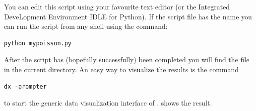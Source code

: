 You can edit this script using your favourite text editor (or the Integrated DeveLopment Environment IDLE
for Python). If the script file has the name   you can run the
script from any shell using the command:
\begin{verbatim} 
python mypoisson.py
\end{verbatim}
After the script has (hopefully successfully) been completed you will find the file  in the current
directory. An easy way to visualize the results is the command
\begin{verbatim} 
dx -prompter
\end{verbatim}
to start the generic data visualization interface of \OpenDX.  shows the result.



 
